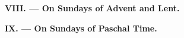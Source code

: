 {\label{benedicamusdomino-lent}\label{benedicamusdomino-advent}
{{\centering \bfseries VIII. — On Sundays of Advent and Lent.\\}
}
\bigskip

\label{benedicamusdomino-easter}
{{\centering \bfseries IX. — On Sundays of Paschal Time.\\}
\def\breakbeforeresp{T}
}

}